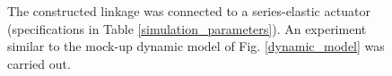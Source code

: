 \documentclass[journal]{IEEEtran}
\begin{document}
\begin{figure}[!t]
\centering
{}
\hfil
{}
\caption{The constructed linkage was connected to a series-elastic actuator (specifications in Table \ref{simulation_parameters}).  An experiment similar to the mock-up dynamic model of Fig. \ref{dynamic_model} was carried out.}
\label{prototype_experiment}
\end{figure}
\end{document}
